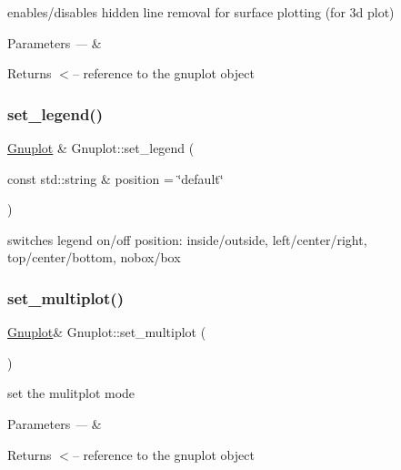 enables/disables hidden line removal for surface plotting (for 3d plot)


\begin{DoxyParams}{Parameters}
{\em ---} & \\
\hline
\end{DoxyParams}
\begin{DoxyReturn}{Returns}
$<$-- reference to the gnuplot object 
\end{DoxyReturn}
\mbox{\label{classGnuplot_ad64a717dac18167f656c4f09239973f8}} 
\subsubsection{\texorpdfstring{set\+\_\+legend()}{set\_legend()}}
{\footnotesize\ttfamily \hyperlink{classGnuplot}{Gnuplot} \& Gnuplot\+::set\+\_\+legend (\begin{DoxyParamCaption}\item[{const std\+::string \&}]{position = {\ttfamily \char`\"{}default\char`\"{}} }\end{DoxyParamCaption})}

switches legend on/off position\+: inside/outside, left/center/right, top/center/bottom, nobox/box \mbox{\label{classGnuplot_a67efc4d4dc46b6100d14ba2f7366ef11}} 
\subsubsection{\texorpdfstring{set\+\_\+multiplot()}{set\_multiplot()}}
{\footnotesize\ttfamily \hyperlink{classGnuplot}{Gnuplot}\& Gnuplot\+::set\+\_\+multiplot (\begin{DoxyParamCaption}{ }\end{DoxyParamCaption})\hspace{0.3cm}{\ttfamily [inline]}}

set the mulitplot mode


\begin{DoxyParams}{Parameters}
{\em ---} & \\
\hline
\end{DoxyParams}
\begin{DoxyReturn}{Returns}
$<$-- reference to the gnuplot object 
\end{DoxyReturn}
\mbox{\label{classGnuplot_aa18386919da2ec4c994f1f9c7195d384}} 
